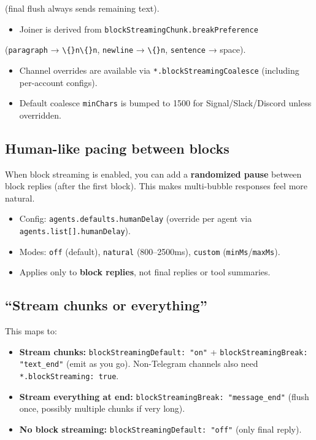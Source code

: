 (final flush always sends remaining text).
\begin{itemize}
  \item Joiner is derived from \texttt{blockStreamingChunk.breakPreference}
\end{itemize}

(\texttt{paragraph} → \texttt{\textbackslash\{\}n\textbackslash\{\}n}, \texttt{newline} → \texttt{\textbackslash\{\}n}, \texttt{sentence} → space).
\begin{itemize}
  \item Channel overrides are available via \texttt{*.blockStreamingCoalesce} (including per-account configs).
  \item Default coalesce \texttt{minChars} is bumped to 1500 for Signal/Slack/Discord unless overridden.
\end{itemize}


\subsection{Human-like pacing between blocks}


When block streaming is enabled, you can add a \textbf{randomized pause} between
block replies (after the first block). This makes multi-bubble responses feel
more natural.

\begin{itemize}
  \item Config: \texttt{agents.defaults.humanDelay} (override per agent via \texttt{agents.list[].humanDelay}).
  \item Modes: \texttt{off} (default), \texttt{natural} (800–2500ms), \texttt{custom} (\texttt{minMs}/\texttt{maxMs}).
  \item Applies only to \textbf{block replies}, not final replies or tool summaries.
\end{itemize}


\subsection{“Stream chunks or everything”}


This maps to:

\begin{itemize}
  \item \textbf{Stream chunks:} \texttt{blockStreamingDefault: "on"} + \texttt{blockStreamingBreak: "text\_end"} (emit as you go). Non-Telegram channels also need \texttt{*.blockStreaming: true}.
  \item \textbf{Stream everything at end:} \texttt{blockStreamingBreak: "message\_end"} (flush once, possibly multiple chunks if very long).
  \item \textbf{No block streaming:} \texttt{blockStreamingDefault: "off"} (only final reply).
\end{itemize}



